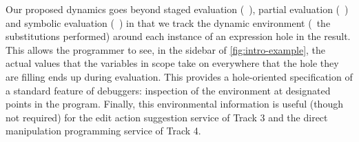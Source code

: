Our proposed dynamics goes beyond staged evaluation (\eg{}~\cite{Taha:1999}), partial evaluation (\eg{}~\cite{Jones:1993uq}) and symbolic evaluation (\eg{}~\cite{King:1976}) in that we track the dynamic environment (\ie{}~the substitutions performed) around each instance of an expression hole in the result. This allows the programmer to see, in the sidebar of \autoref{fig:intro-example}, the actual values that the variables in scope take on everywhere that the hole they are filling ends up during evaluation. This provides a hole-oriented specification of a standard feature of debuggers: inspection of the environment at designated points in the program. Finally, this environmental information is useful (though not required) for the edit action suggestion service of Track 3 and the direct manipulation programming service of Track 4. 
